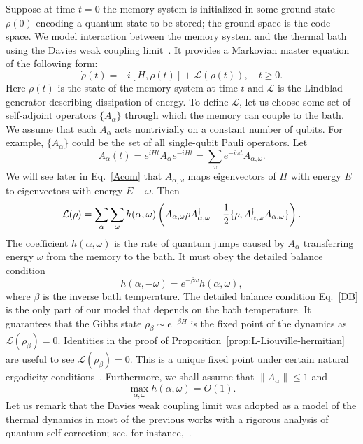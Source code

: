 Suppose at time $t=0$ the memory system is initialized in some ground state $\rho(0)$
encoding a quantum state to be stored; the ground space is the code space.
We model interaction between the memory system and the thermal bath
using the Davies weak coupling limit~\cite{Davies1974}.
It provides a Markovian master equation of the following form:
\begin{equation}
\dot{\rho}(t)=-i[H,\rho(t)] + \mathcal L(\rho(t)), \quad t\ge 0.
\label{eq:Markovian-master}
\end{equation}
Here $\rho(t)$ is the state of the memory system at time $t$ 
and $\mathcal L$ is the Lindblad generator describing dissipation of energy.
To define $\mathcal L$, let us choose some set of self-adjoint operators 
$\{A_\alpha\}$ through which the memory can couple to the bath.
We assume that each $A_\alpha$ acts nontrivially on a constant number of qubits.
For example, $\{A_\alpha\}$ could be the set of all single-qubit Pauli operators.
Let 
\begin{equation}
A_{\alpha}(t)= e^{iHt} A_\alpha e^{-iHt} = \sum_\omega e^{-i\omega t} A_{\alpha,\omega} .
\label{eq:jump-ops}
\end{equation}
We will see later in Eq.~\eqref{Acom} that 
$A_{\alpha,\omega}$ maps eigenvectors of $H$ with energy $E$ 
to eigenvectors with energy $E-\omega$.
Then
\begin{equation}
\mathcal L( \rho) = \sum_\alpha \sum_\omega h(\alpha,\omega) 
\left(
A_{\alpha,\omega} \rho A_{\alpha,\omega}^\dag - \frac{1}{2} \{  \rho,A_{\alpha,\omega}^\dag A_{\alpha,\omega} \} 
\right).
\label{eq:lindbladian}
\end{equation}
The coefficient $h(\alpha,\omega)$ is the rate of quantum jumps caused by $A_\alpha$ 
transferring energy $\omega$ from the memory to the bath.
It must obey the detailed balance condition~\cite{Davies1974}
\begin{equation}
\label{DB}
h(\alpha,-\omega)=e^{-\beta \omega} h(\alpha,\omega),
\end{equation}
where $\beta$ is the inverse bath temperature.
The detailed balance condition Eq.~\eqref{DB} is the only part
of our model that depends on  the bath temperature. 
It guarantees that the Gibbs state $\rho_\beta \sim e^{-\beta H}$ 
is the fixed point of the dynamics as $\mathcal L(\rho_\beta)=0$.
Identities in the proof of Proposition~\ref{prop:L-Liouville-hermitian}
are useful to see $\mathcal L(\rho_\beta) = 0$.
This is a unique fixed point under certain natural ergodicity conditions~\cite{Spohn1977}.
Furthermore, we shall assume that $\|A_\alpha\|\le 1$ and
\begin{equation}
\label{eq:weak}
\max_{\alpha,\omega} h(\alpha,\omega) = O(1).
\end{equation}
Let us remark that the Davies weak coupling limit was adopted
as a  model of the thermal dynamics
in most of the previous works with a rigorous analysis of quantum self-correction;
see, for instance,~\cite{AlickiHorodeckiHorodeckiEtAl2010thermal,
AlickiFannesHorodecki2009thermalization,
ChesiLossBravyiEtAl2010Thermodynamic,
ChesiRoethlisbergerLoss2010Self-Correcting}.


